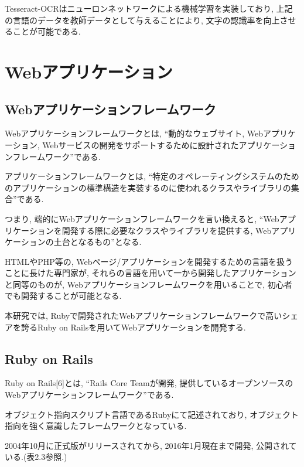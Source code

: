 Tesseract-OCRはニューロンネットワークによる機械学習を実装しており, 上記の言語のデータを教師データとして与えることにより, 文字の認識率を向上させることが可能である.

\section{Webアプリケーション}
\subsection{Webアプリケーションフレームワーク}
Webアプリケーションフレームワークとは, “動的なウェブサイト, Webアプリケーション, Webサービスの開発をサポートするために設計されたアプリケーションフレームワーク”である.

アプリケーションフレームワークとは, “特定のオペレーティングシステムのためのアプリケーションの標準構造を実装するのに使われるクラスやライブラリの集合”である.

つまり, 端的にWebアプリケーションフレームワークを言い換えると, “Webアプリケーションを開発する際に必要なクラスやライブラリを提供する, Webアプリケーションの土台となるもの”となる.

HTMLやPHP等の, Webページ/アプリケーションを開発するための言語を扱うことに長けた専門家が, それらの言語を用いて一から開発したアプリケーションと同等のものが, Webアプリケーションフレームワークを用いることで, 初心者でも開発することが可能となる.

本研究では, Rubyで開発されたWebアプリケーションフレームワークで高いシェアを誇るRuby on Railsを用いてWebアプリケーションを開発する.

\subsection{Ruby on Rails}
Ruby on Rails[6]とは, “Rails Core Teamが開発, 提供しているオープンソースのWebアプリケーションフレームワーク”である.

オブジェクト指向スクリプト言語であるRubyにて記述されており, オブジェクト指向を強く意識したフレームワークとなっている.

2004年10月に正式版がリリースされてから, 2016年1月現在まで開発, 公開されている.(表2.3参照.)

